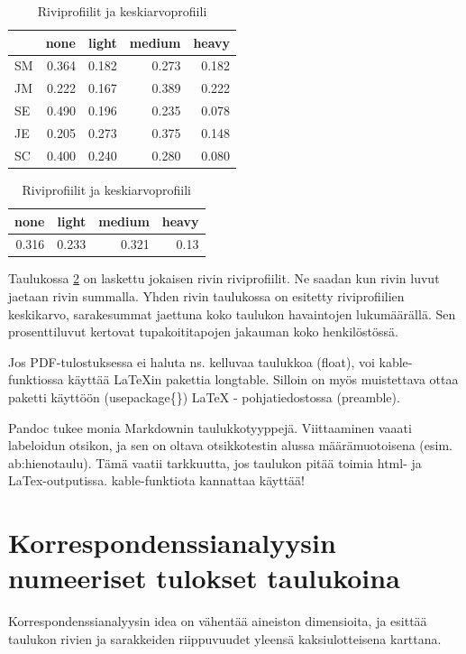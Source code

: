 \documentclass[finnish,]{book}
\begin{document}
\begin{table}
\caption{\label{tab:smoketable2}Riviprofiilit ja keskiarvoprofiili}

\centering
\begin{tabular}{lrrrr}
\toprule
  & none & light & medium & heavy\\
\midrule
SM & 0.364 & 0.182 & 0.273 & 0.182\\
JM & 0.222 & 0.167 & 0.389 & 0.222\\
SE & 0.490 & 0.196 & 0.235 & 0.078\\
JE & 0.205 & 0.273 & 0.375 & 0.148\\
SC & 0.400 & 0.240 & 0.280 & 0.080\\
\bottomrule
\end{tabular}
\centering
\begin{tabular}{rrrr}
\toprule
none & light & medium & heavy\\
\midrule
0.316 & 0.233 & 0.321 & 0.13\\
\bottomrule
\end{tabular}
\end{table}

Taulukossa \ref{tab:smoketable2} on laskettu jokaisen rivin riviprofiilit. Ne saadan kun rivin luvut jaetaan rivin summalla. Yhden rivin taulukossa on esitetty riviprofiilien keskikarvo, sarakesummat jaettuna koko taulukon havaintojen lukumäärällä. Sen prosenttiluvut kertovat tupakoititapojen jakauman koko henkilöstössä.

Jos PDF-tulostuksessa ei haluta ns. kelluvaa taulukkoa (float), voi kable-funktiossa käyttää LaTeXin pakettia longtable. Silloin on myös muistettava ottaa paketti käyttöön (usepackage\{\}) LaTeX - pohjatiedostossa (preamble).

Pandoc tukee monia Markdownin taulukkotyyppejä. Viittaaminen vaaati labeloidun otsikon, ja sen on oltava otsikkotestin alussa määrämuotoisena (esim. ab:hienotaulu). Tämä vaatii tarkkuutta, jos taulukon pitää toimia html- ja LaTex-outputissa. kable-funktiota kannattaa käyttää!

\hypertarget{korrespondenssianalyysin-numeeriset-tulokset-taulukoina}{%
\section{Korrespondenssianalyysin numeeriset tulokset taulukoina}\label{korrespondenssianalyysin-numeeriset-tulokset-taulukoina}}

Korrespondenssianalyysin idea on vähentää aineiston dimensioita, ja esittää taulukon rivien ja sarakkeiden riippuvuudet yleensä kaksiulotteisena karttana.
\end{document}

